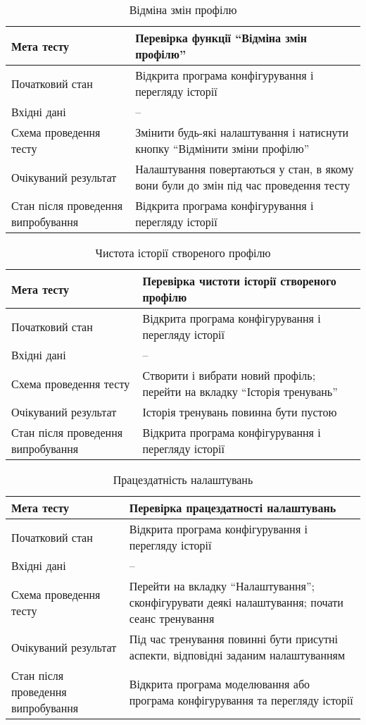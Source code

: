 \small\begin{longtable}{| C{6cm} | C{10cm} |}
  \caption{Відміна змін профілю}
  \label{table:undo-profile-changes} \\
  \hline
  Мета тесту & Перевірка функції ``Відміна змін профілю'' \\
  \hline
  Початковий стан
  & Відкрита програма конфігурування і перегляду історії \\
  \hline
  Вхідні дані
  & -- \\
  \hline
  Схема проведення тесту
  & Змінити будь-які налаштування і натиснути кнопку ``Відмінити зміни профілю'' \\
  \hline
  Очікуваний результат
  & Налаштування повертаються у стан, в якому вони були до змін під час проведення тесту \\
  \hline
  Стан після проведення випробування
  & Відкрита програма конфігурування і перегляду історії \\
  \hline
\end{longtable}\normalsize

\small\begin{longtable}{| C{6cm} | C{10cm} |}
  \caption{Чистота історії створеного профілю}
  \label{table:new-profile-clean-history} \\
  \hline
  Мета тесту & Перевірка чистоти історії створеного профілю \\
  \hline
  Початковий стан
  & Відкрита програма конфігурування і перегляду історії \\
  \hline
  Вхідні дані
  & -- \\
  \hline
  Схема проведення тесту
  & Створити і вибрати новий профіль; перейти на вкладку ``Історія тренувань'' \\
  \hline
  Очікуваний результат
  & Історія тренувань повинна бути пустою \\
  \hline
  Стан після проведення випробування
  & Відкрита програма конфігурування і перегляду історії \\
  \hline
\end{longtable}\normalsize
\newpage
\small\begin{longtable}{| C{6cm} | C{10cm} |}
  \caption{Працездатність налаштувань}
  \label{table:config-correctness} \\
  \hline
  Мета тесту & Перевірка працездатності налаштувань \\
  \hline
  Початковий стан
  & Відкрита програма конфігурування і перегляду історії \\
  \hline
  Вхідні дані
  & -- \\
  \hline
  Схема проведення тесту
  & Перейти на вкладку ``Налаштування''; сконфігурувати деякі налаштування; почати сеанс тренування \\
  \hline
  Очікуваний результат
  & Під час тренування повинні бути присутні аспекти, відповідні заданим налаштуванням \\
  \hline
  Стан після проведення випробування
  & Відкрита програма моделювання або програма конфігурування та перегляду історії \\
  \hline
\end{longtable}\normalsize

